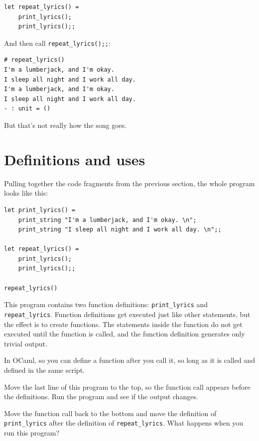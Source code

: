 \documentclass[10pt]{book}
\begin{document}
\beforeverb
\begin{verbatim}
let repeat_lyrics() = 
    print_lyrics();
    print_lyrics();;
\end{verbatim}
\afterverb
%
And then call \verb"repeat_lyrics();;":

\beforeverb
\begin{verbatim}
# repeat_lyrics()
I'm a lumberjack, and I'm okay.
I sleep all night and I work all day.
I'm a lumberjack, and I'm okay.
I sleep all night and I work all day.
- : unit = ()
\end{verbatim}
\afterverb
%
But that's not really how the song goes.


\section{Definitions and uses}

Pulling together the code fragments from the previous section, the
whole program looks like this:

\beforeverb
\begin{verbatim}
let print_lyrics() =
    print_string "I'm a lumberjack, and I'm okay. \n";
    print_string "I sleep all night and I work all day. \n";;

let repeat_lyrics() =
    print_lyrics();
    print_lyrics();;

repeat_lyrics()
\end{verbatim}
\afterverb
%
This program contains two function definitions: \verb"print_lyrics" and
\verb"repeat_lyrics".  Function definitions get executed just like other
statements, but the effect is to create functions.  The statements
inside the function do not get executed until the function is called, and
the function definition generates only trivial output.

In OCaml, so you can define a function after you call it, so long as it is 
called and defined in the same script.

\begin{ex}
Move the last line of this program
to the top, so the function call appears before the definitions. Run 
the program and see if the output changes.
\end{ex}

\begin{ex}
Move the function call back to the bottom
and move the definition of \verb"print_lyrics" after the definition of
\verb"repeat_lyrics".  What happens when you run this program?
\end{ex}
\end{document}
